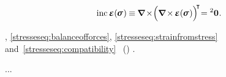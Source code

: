 \nopagebreak\vspace{-0.5em}
\begin{equation}\label{stresseseq:compatibility}
\operatorname{inc} \infinitesimaldeformation(\hspace{-0.15ex}\linearstress\hspace{.1ex}) \hspace{-0.1ex}
\equiv
\hspace{-0.1ex} \boldnabla \hspace{-0.2ex} \times \hspace{-0.44ex} \Bigl(
   \boldnabla \hspace{-0.2ex} \times \hspace{-0.16ex} \infinitesimaldeformation ( \hspace{-0.1ex} \linearstress \hspace{.1ex} )
\Bigr)^{\raisemath{-0.12em}{\hspace{-0.44ex}\T}} \hspace{-0.52ex}
= \zerobivalent
\hspace{.1ex} .
\end{equation}

\vspace{-0.3em}\noindent
{}, \eqref{stresseseq:balanceofforces}, \eqref{stresseseq:strainfromstress} and~\eqref{stresseseq:compatibility}  ~()  .

...

